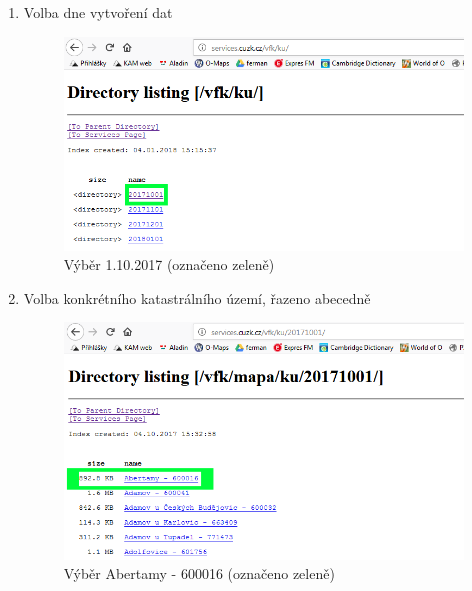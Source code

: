 \begin{enumerate}
  \item{Volba dne vytvoření dat}
  \begin{figure}[H]
	 \centering
      \includegraphics[width=15cm]{./pictures/stazeni_dat_3kr.png}
      \caption{Výběr 1.10.2017 (označeno zeleně)}
      \label{fig:3kr_stazeni}
  \end{figure}
  
  \item{Volba konkrétního katastrálního území, řazeno abecedně}
  \begin{figure}[H]
	 \centering
      \includegraphics[width=15cm]{./pictures/stazeni_dat_4kr.png}
      \caption{Výběr Abertamy - 600016 (označeno zeleně)}
      \label{fig:4kr_stazeni}
  \end{figure}
  

\end{enumerate}
